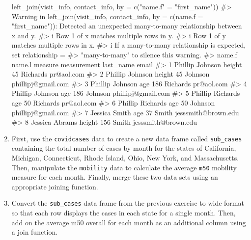 \documentclass[
  letterpaper,
]{krantz}
\makeatletter
\newenvironment{Shaded}{\begin{snugshade}}{\end{snugshade}}
\newcommand{\AttributeTok}[1]{\textcolor[rgb]{0.40,0.45,0.13}{#1}}
\newcommand{\CommentTok}[1]{\textcolor[rgb]{0.37,0.37,0.37}{#1}}
\newcommand{\FunctionTok}[1]{\textcolor[rgb]{0.28,0.35,0.67}{#1}}
\newcommand{\NormalTok}[1]{\textcolor[rgb]{0.00,0.23,0.31}{#1}}
\newcommand{\OtherTok}[1]{\textcolor[rgb]{0.00,0.23,0.31}{#1}}
\newcommand{\StringTok}[1]{\textcolor[rgb]{0.13,0.47,0.30}{#1}}
\newenvironment{kframe}{%
\medskip{}
\setlength{\fboxsep}{.8em}
 \def\at@end@of@kframe{}%
 \ifinner\ifhmode%
  \def\at@end@of@kframe{\end{minipage}}%
  \begin{minipage}{\columnwidth}%
 \fi\fi%
 \def\FrameCommand##1{\hskip\@totalleftmargin \hskip-\fboxsep
 \colorbox{shadecolor}{##1}\hskip-\fboxsep
     \hskip-\linewidth \hskip-\@totalleftmargin \hskip\columnwidth}%
 \MakeFramed {\advance\hsize-\width
   \@totalleftmargin\z@ \linewidth\hsize
   \@setminipage}}%
 {\par\unskip\endMakeFramed%
 \at@end@of@kframe}
\renewenvironment{Shaded}{\begin{kframe}}{\end{kframe}}
\makeatother
\begin{document}
\begin{enumerate}
\begin{Shaded}
\begin{Highlighting}[]
\FunctionTok{left\_join}\NormalTok{(visit\_info, contact\_info, }\AttributeTok{by =} \FunctionTok{c}\NormalTok{(}\StringTok{"name.f"} \OtherTok{=} \StringTok{"first\_name"}\NormalTok{))}
\CommentTok{\#\textgreater{} Warning in left\_join(visit\_info, contact\_info, by = c(name.f = "first\_name")): Detected an unexpected many{-}to{-}many relationship between \textasciigrave{}x\textasciigrave{} and \textasciigrave{}y\textasciigrave{}.}
\CommentTok{\#\textgreater{} i Row 1 of \textasciigrave{}x\textasciigrave{} matches multiple rows in \textasciigrave{}y\textasciigrave{}.}
\CommentTok{\#\textgreater{} i Row 1 of \textasciigrave{}y\textasciigrave{} matches multiple rows in \textasciigrave{}x\textasciigrave{}.}
\CommentTok{\#\textgreater{} i If a many{-}to{-}many relationship is expected, set \textasciigrave{}relationship =}
\CommentTok{\#\textgreater{}   "many{-}to{-}many"\textasciigrave{} to silence this warning.}
\CommentTok{\#\textgreater{}    name.f   name.l measure measurement last\_name               email}
\CommentTok{\#\textgreater{} 1 Phillip  Johnson  height          45  Richards          pr@aol.com}
\CommentTok{\#\textgreater{} 2 Phillip  Johnson  height          45   Johnson  phillipj@gmail.com}
\CommentTok{\#\textgreater{} 3 Phillip  Johnson     age         186  Richards          pr@aol.com}
\CommentTok{\#\textgreater{} 4 Phillip  Johnson     age         186   Johnson  phillipj@gmail.com}
\CommentTok{\#\textgreater{} 5 Phillip Richards     age          50  Richards          pr@aol.com}
\CommentTok{\#\textgreater{} 6 Phillip Richards     age          50   Johnson  phillipj@gmail.com}
\CommentTok{\#\textgreater{} 7 Jessica    Smith     age          37     Smith jesssmith@brown.edu}
\CommentTok{\#\textgreater{} 8 Jessica   Abrams  height         156     Smith jesssmith@brown.edu}
\end{Highlighting}
\end{Shaded}
\item
  First, use the \texttt{covidcases} data to create a new data frame
  called \texttt{sub\_cases} containing the total number of cases by
  month for the states of California, Michigan, Connecticut, Rhode
  Island, Ohio, New York, and Massachusetts. Then, manipulate the
  \texttt{mobility} data to calculate the average \texttt{m50} mobility
  measure for each month. Finally, merge these two data sets using an
  appropriate joining function.
\item
  Convert the \texttt{sub\_cases} data frame from the previous exercise
  to wide format so that each row displays the cases in each state for a
  single month. Then, add on the average m50 overall for each month as
  an additional column using a join function.
\end{enumerate}
\end{document}
